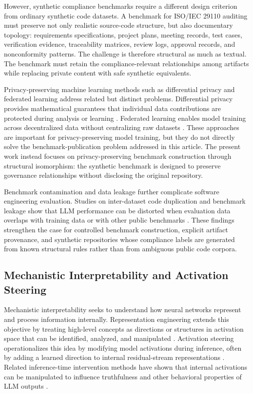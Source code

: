 \documentclass{ieeeaccess}
\begin{document}
However, synthetic compliance benchmarks require a different design criterion from ordinary synthetic code datasets. A benchmark for ISO/IEC 29110 auditing must preserve not only realistic source-code structure, but also documentary topology: requirements specifications, project plans, meeting records, test cases, verification evidence, traceability matrices, review logs, approval records, and nonconformity patterns. The challenge is therefore structural as much as textual. The benchmark must retain the compliance-relevant relationships among artifacts while replacing private content with safe synthetic equivalents.

Privacy-preserving machine learning methods such as differential privacy and federated learning address related but distinct problems. Differential privacy provides mathematical guarantees that individual data contributions are protected during analysis or learning \cite{dwork2006differentialprivacy}. Federated learning enables model training across decentralized data without centralizing raw datasets \cite{mcmahan2017communication}. These approaches are important for privacy-preserving model training, but they do not directly solve the benchmark-publication problem addressed in this article. The present work instead focuses on privacy-preserving benchmark construction through structural isomorphism: the synthetic benchmark is designed to preserve governance relationships without disclosing the original repository.

Benchmark contamination and data leakage further complicate software engineering evaluation. Studies on inter-dataset code duplication and benchmark leakage show that LLM performance can be distorted when evaluation data overlaps with training data or with other public benchmarks \cite{hernandez2024codeduplication,zhou2025lessleak}. These findings strengthen the case for controlled benchmark construction, explicit artifact provenance, and synthetic repositories whose compliance labels are generated from known structural rules rather than from ambiguous public code corpora.

\subsection{Mechanistic Interpretability and Activation Steering}
\label{subsec:rw_activation_steering}

Mechanistic interpretability seeks to understand how neural networks represent and process information internally. Representation engineering extends this objective by treating high-level concepts as directions or structures in activation space that can be identified, analyzed, and manipulated \cite{zou2023representation}. Activation steering operationalizes this idea by modifying model activations during inference, often by adding a learned direction to internal residual-stream representations \cite{turner2023activation}. Related inference-time intervention methods have shown that internal activations can be manipulated to influence truthfulness and other behavioral properties of LLM outputs \cite{li2023iti}.
\end{document}
